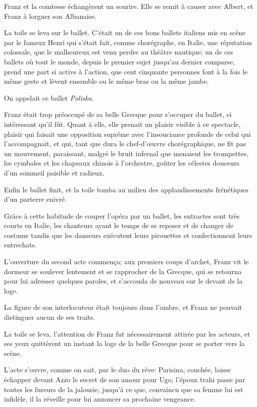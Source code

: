 Franz et la comtesse échangèrent un sourire. Elle se remit à causer avec Albert, et Franz à lorgner son Albanaise. 

La toile se leva sur le ballet. C'était un de ces bons ballets italiens mis en scène par le fameux Henri qui s'était fait, comme chorégraphe, en Italie, une réputation colossale, que le malheureux est venu perdre au théâtre nautique; un de ces ballets où tout le monde, depuis le premier sujet jusqu'au dernier comparse, prend une part si active à l'action, que cent cinquante personnes font à la fois le même geste et lèvent ensemble ou le même bras ou la même jambe. 

On appelait ce ballet \textit{Poliska}. 

Franz était trop préoccupé de sa belle Grecque pour s'occuper du ballet, si intéressant qu'il fût. Quant à elle, elle prenait un plaisir visible à ce spectacle, plaisir qui faisait une opposition suprême avec l'insouciance profonde de celui qui l'accompagnait, et qui, tant que dura le chef-d'œuvre chorégraphique, ne fit pas un mouvement, paraissant, malgré le bruit infernal que menaient les trompettes, les cymbales et les chapeaux chinois à l'orchestre, goûter les célestes douceurs d'un sommeil paisible et radieux. 

Enfin le ballet finit, et la toile tomba au milieu des applaudissements frénétiques d'un parterre enivré. 

Grâce à cette habitude de couper l'opéra par un ballet, les entractes sont très courts en Italie, les chanteurs ayant le temps de se reposer et de changer de costume tandis que les danseurs exécutent leurs pirouettes et confectionnent leurs entrechats. 

L'ouverture du second acte commença; aux premiers coups d'archet, Franz vit le dormeur se soulever lentement et se rapprocher de la Grecque, qui se retourna pour lui adresser quelques paroles, et s'accouda de nouveau sur le devant de la loge. 

La figure de son interlocuteur était toujours dans l'ombre, et Franz ne pouvait distinguer aucun de ses traits. 

La toile se leva, l'attention de Franz fut nécessairement attirée par les acteurs, et ses yeux quittèrent un instant la loge de la belle Grecque pour se porter vers la scène. 

L'acte s'ouvre, comme on sait, par le duo du rêve: Parisina, couchée, laisse échapper devant Azzo le secret de son amour pour Ugo; l'époux trahi passe par toutes les fureurs de la jalousie, jusqu'à ce que, convaincu que sa femme lui est infidèle, il la réveille pour lui annoncer sa prochaine vengeance. 

